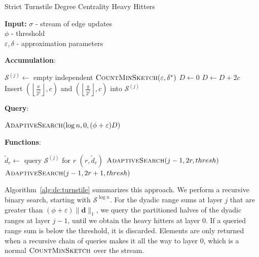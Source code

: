 \documentclass{report}
\newcommand{\algoname}[1]{\textnormal{\textsc{#1}}}
\begin{document}
\begin{algorithm}[htbp] 
\caption{Strict Turnstile Degree Centrality Heavy Hitters}\label{alg:dc:turnstile}
\begin{flushleft}
        \textbf{Input:} 		$\sigma$ - stream of edge updates\\
        	\hspace{3.2em}	$\phi$ - threshold\\
        	\hspace{3.2em}	$\varepsilon, \delta$ - approximation parameters\\
\end{flushleft}
\textbf{Accumulation}:
\begin{algorithmic}[1]
		\State $\mathcal{S}^{(j)} \gets $ empty independent $\algoname{CountMinSketch}(\varepsilon, \delta^*)$
	\EndFor
	\State $D \gets 0$
		\State $D \gets D + 2c$
			\State Insert $\left ( \left \lfloor \frac{x}{2^j} \right \rfloor, c \right )$ and $\left ( \left \lfloor \frac{y}{2^j} \right \rfloor, c \right )$ into $\mathcal{S}^{(j)}$
		\EndFor
	\EndFor
\end{algorithmic}
\textbf{Query}:
\begin{algorithmic}[1]
	\State \Return $\algoname{AdaptiveSearch}(\log n, 0, (\phi + \varepsilon) D)$
\end{algorithmic}
\textbf{Functions}:
\begin{algorithmic}[1]
		\State $\widetilde{d}_r \gets $ query $\mathcal{S}^{(j)}$ for $r$
				\State \Return $\left ( r, \widetilde{d}_r \right )$
			\Else 
				\State $\algoname{AdaptiveSearch}(j - 1, 2r, thresh)$
				\State $\algoname{AdaptiveSearch}(j - 1, 2r + 1, thresh)$
			\EndIf
		\EndIf
	\EndFunction
\end{algorithmic}
\end{algorithm}

Algorithm~\ref{alg:dc:turnstile} summarizes this approach.
We perform a recursive binary search, starting with $\mathcal{S}^{\log n}$.
For the dyadic range sums at layer $j$ that are greater than $(\phi + \varepsilon) \|\mathbf{d}\|_1$, we query the partitioned halves of the dyadic ranges at layer $j-1$, until we obtain the heavy hitters at layer $0$.  
If a queried range sum is below the threshold, it is discarded. 
Elements are only returned when a recursive chain of queries makes it all the way to layer $0$, which is a normal $\algoname{CountMinSketch}$ over the stream.
\end{document}

